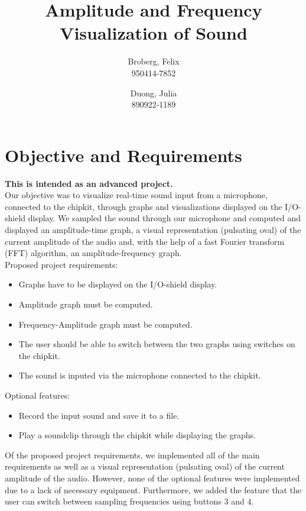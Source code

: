 \documentclass[a4paper,11pt]{article}
\author{
  Broberg, Felix\\
  950414-7852
  \and
  Duong, Julia\\
  890922-1189
}
\title{Amplitude and Frequency Visualization of Sound}
\begin{document}
\maketitle


\section*{Objective and Requirements}
\textbf{This is intended as an advanced project.}\\
Our objective was to visualize real-time sound input from a microphone, connected to the chipkit, through graphs and visualizations displayed on the I/O-shield display. We sampled the sound through our microphone and computed and displayed an amplitude-time graph, a visual representation (pulsating oval) of the current amplitude of the audio and, with the help of a fast Fourier transform (FFT) algorithm, an amplitude-frequency graph.\\
\newline
Proposed project requirements:

\begin{itemize}
\item Graphs have to be displayed on the I/O-shield display.
\item Amplitude graph must be computed.
\item Frequency-Amplitude graph must be computed.
\item The user should be able to switch between the two graphs using switches on the chipkit.
\item The sound is inputed via the microphone connected to the chipkit.
\end{itemize}
Optional features:
\begin{itemize}
\item Record the input sound and save it to a file.
\item Play a soundclip through the chipkit while displaying the graphs.
\end{itemize}
Of the proposed project requirements, we implemented all of the main requirements as well as a visual representation (pulsating oval) of the current amplitude of the audio. However, none of the optional features were implemented due to a lack of necessary equipment. Furthermore, we added the feature that the user can switch between sampling frequencies using buttons 3 and 4. 


\end{document}
